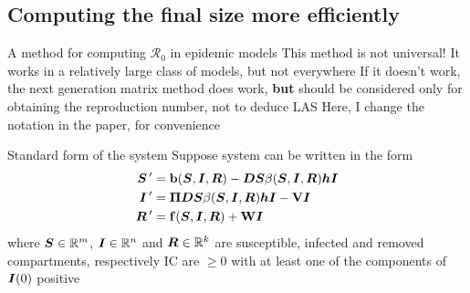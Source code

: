 \documentclass[aspectratio=169]{beamer}\usepackage[]{graphicx}\usepackage[]{xcolor}
\begin{document}


\subsection{Computing the final size more efficiently}


\begin{frame}{A method for computing $\mathcal{R}_0$ in epidemic models}
\bbullet This method is not universal! It works in a relatively large class of models, but not everywhere
\vfill
\bbullet If it doesn't work, the next generation matrix method does work, \textbf{but} should be considered only for obtaining the reproduction number, not to deduce LAS
\vfill
\bbullet Here, I change the notation in the paper, for convenience
\end{frame}

\begin{frame}{Standard form of the system}
Suppose system can be written in the form
\begin{subequations}\label{sys:SIR_general}
\begin{align}
\bm{S}\,' &= \mathbf{b}(\bm{S},\bm{I},\bm{R})-\bm{D}\bm{S}\beta(\bm{S},\bm{I},\bm{R})\bm{h}\bm{I} \label{sys:SIR_general_dS} \\
\bm{I}\,' &= \bm{\Pi}\bm{D}\bm{S}\beta(\bm{S},\bm{I},\bm{R})\bm{h}\bm{I}-\mathbf{V}\bm{I} \label{sys:SIR_general_dI} \\
\bm{R}\,' &= \mathbf{f}(\bm{S},\bm{I},\bm{R})+\mathbf{W}\bm{I} \label{sys:SIR_general_dR}
\end{align}
\end{subequations}
\vfill
where $\bm{S}\in\mathbb{R}^m$, $\bm{I}\in\mathbb{R}^n$ and $\bm{R}\in\mathbb{R}^k$ are susceptible, infected and removed compartments, respectively
\vfill
IC are $\geq 0$ with at least one of the components of $\bm{I}(0)$ positive
\end{frame}  
\end{document}
